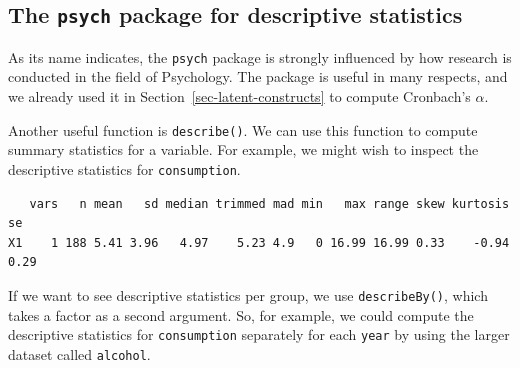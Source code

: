 \documentclass[
  letterpaper,
]{krantz}
\makeatletter
\newenvironment{Shaded}{\begin{snugshade}}{\end{snugshade}}
\newcommand{\CommentTok}[1]{\textcolor[rgb]{0.37,0.37,0.37}{#1}}
\newcommand{\DecValTok}[1]{\textcolor[rgb]{0.68,0.00,0.00}{#1}}
\newcommand{\FunctionTok}[1]{\textcolor[rgb]{0.28,0.35,0.67}{#1}}
\newcommand{\NormalTok}[1]{\textcolor[rgb]{0.00,0.23,0.31}{#1}}
\newcommand{\OtherTok}[1]{\textcolor[rgb]{0.00,0.23,0.31}{#1}}
\newcommand{\SpecialCharTok}[1]{\textcolor[rgb]{0.37,0.37,0.37}{#1}}
\newenvironment{kframe}{%
\medskip{}
\setlength{\fboxsep}{.8em}
 \def\at@end@of@kframe{}%
 \ifinner\ifhmode%
  \def\at@end@of@kframe{\end{minipage}}%
  \begin{minipage}{\columnwidth}%
 \fi\fi%
 \def\FrameCommand##1{\hskip\@totalleftmargin \hskip-\fboxsep
 \colorbox{shadecolor}{##1}\hskip-\fboxsep
     \hskip-\linewidth \hskip-\@totalleftmargin \hskip\columnwidth}%
 \MakeFramed {\advance\hsize-\width
   \@totalleftmargin\z@ \linewidth\hsize
   \@setminipage}}%
 {\par\unskip\endMakeFramed%
 \at@end@of@kframe}
\renewenvironment{Shaded}{\begin{kframe}}{\end{kframe}}
\makeatother
\begin{document}
\subsection{\texorpdfstring{The \texttt{psych} package for descriptive
statistics}{The psych package for descriptive statistics}}\label{sec-psych-package}

As its name indicates, the \texttt{psych} package is strongly influenced
by how research is conducted in the field of Psychology. The package is
useful in many respects, and we already used it in
Section~\ref{sec-latent-constructs} to compute Cronbach's \(\alpha\).

Another useful function is \texttt{describe()}. We can use this function
to compute summary statistics for a variable. For example, we might wish
to inspect the descriptive statistics for \texttt{consumption}.

\begin{Shaded}
\end{Shaded}

\begin{verbatim}
   vars   n mean   sd median trimmed mad min   max range skew kurtosis   se
X1    1 188 5.41 3.96   4.97    5.23 4.9   0 16.99 16.99 0.33    -0.94 0.29
\end{verbatim}

If we want to see descriptive statistics per group, we use
\texttt{describeBy()}, which takes a factor as a second argument. So,
for example, we could compute the descriptive statistics for
\texttt{consumption} separately for each \texttt{year} by using the
larger dataset called \texttt{alcohol}.

\begin{Shaded}
\end{Shaded}
\end{document}
